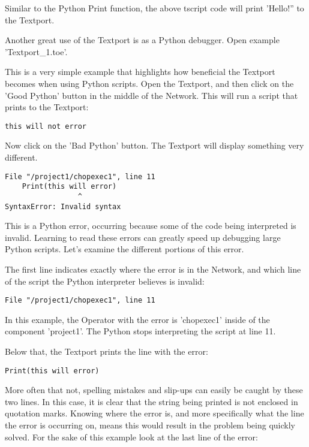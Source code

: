 \begin{fullwidth}
Similar to the Python Print function, the above tscript code will print 'Hello!'' to the Textport.

Another great use of the Textport is as a Python debugger. Open example 'Textport\_1.toe'.

This is a very simple example that highlights how beneficial the Textport becomes when using Python scripts. Open the Textport, and then click on the 'Good Python' button in the middle of the Network. This will run a script that prints to the Textport:

\begin{lstlisting}
this will not error
\end{lstlisting}

Now click on the 'Bad Python' button. The Textport will display something very different.

\begin{lstlisting}
File "/project1/chopexec1", line 11
	Print(this will error)
			     ^
SyntaxError: Invalid syntax
\end{lstlisting}

This is a Python error, occurring because some of the code being interpreted is invalid. Learning to read these errors can greatly speed up debugging large Python scripts. Let's examine the different portions of this error.

The first line indicates exactly where the error is in the Network, and which line of the script the Python interpreter believes is invalid:

\begin{lstlisting}
File "/project1/chopexec1", line 11
\end{lstlisting}

In this example, the Operator with the error is 'chopexec1' inside of the component 'project1'. The Python stops interpreting the script at line 11.

Below that, the Textport prints the line with the error:

\begin{lstlisting}
Print(this will error)
\end{lstlisting}

More often that not, spelling mistakes and slip-ups can easily be caught by these two lines. In this case, it is clear that the string being printed is not enclosed in quotation marks. Knowing where the error is, and more specifically what the line the error is occurring on, means this would result in the problem being quickly solved. For the sake of this example look at the last line of the error:


\end{fullwidth}
